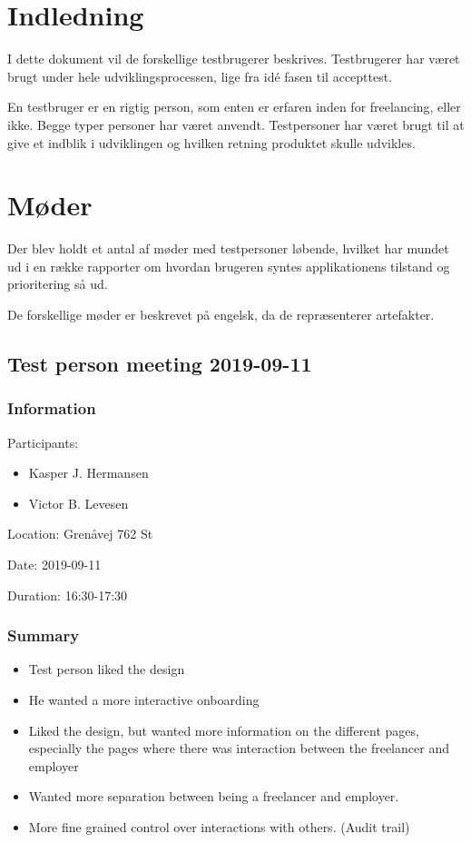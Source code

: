 \chapter{Indledning}

I dette dokument vil de forskellige testbrugerer beskrives. Testbrugerer har været brugt under hele udviklingsprocessen, lige fra idé fasen til accepttest.

En testbruger er en rigtig person, som enten er erfaren inden for freelancing, eller ikke. Begge typer personer har været anvendt. Testpersoner har været brugt til at give et indblik i udviklingen og hvilken retning produktet skulle udvikles.

\chapter{Møder}

Der blev holdt et antal af møder med testpersoner løbende, hvilket har mundet ud i en række rapporter om hvordan brugeren syntes applikationens tilstand og prioritering så ud.

De forskellige møder er beskrevet på engelsk, da de repræsenterer artefakter.

\newpage
\section{Test person meeting 2019-09-11}

\subsection{Information}
Participants:
\begin{itemize}
    \item Kasper J. Hermansen
    \item Victor B. Levesen
\end{itemize}
Location:
Grenåvej 762 St

Date:
2019-09-11

Duration:
16:30-17:30

\subsection{Summary}

\begin{itemize}
    \item Test person liked the design
    \item He wanted a more interactive onboarding
    \item Liked the design, but wanted more information on the different pages, especially the pages where there was interaction between the freelancer and employer
    \item Wanted more separation between being a freelancer and employer.
    \item More fine grained control over interactions with others. (Audit trail)
\end{itemize}

